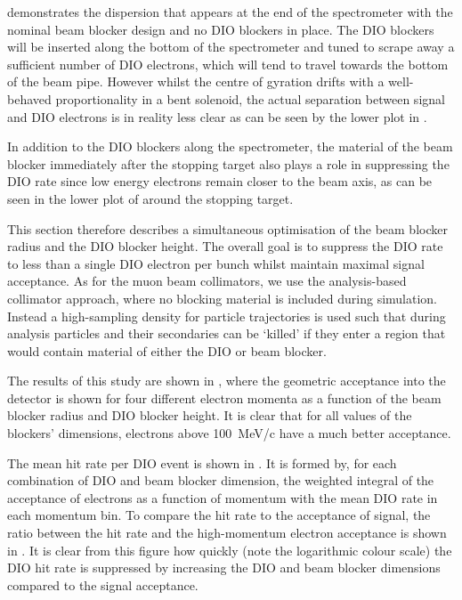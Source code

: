  demonstrates the dispersion that appears at the end of the spectrometer with the nominal beam blocker design and no DIO blockers in place.
The DIO blockers will be inserted along the bottom of the spectrometer and tuned to scrape away a sufficient number of DIO electrons, which will tend to travel towards the bottom of the beam pipe.
However whilst the centre of gyration drifts with a well-behaved proportionality in a bent solenoid, the actual separation between signal and \ac{DIO} electrons is in reality less clear as can be seen by the lower plot in .

In addition to the DIO blockers along the spectrometer, the material of the beam blocker immediately after the stopping target also plays a role in suppressing the \ac{DIO} rate since low energy electrons remain closer to the beam axis, as can be seen in the lower plot of  around the stopping target.

This section therefore describes a simultaneous optimisation of the beam blocker radius and the DIO blocker height.
The overall goal is to suppress the DIO rate to less than a single DIO electron per bunch whilst maintain maximal signal acceptance.
As for the muon beam collimators, we use the analysis-based collimator approach, where no blocking material is included during simulation.
Instead a high-sampling density for particle trajectories is used such that during analysis particles and their secondaries can be `killed' if they enter a region that would contain material of either the DIO or beam blocker.

\FigOptimDIOBeamBlockAcceptances
\FigOptimDIOBeamBlockHitRate
The results of this study are shown in , where the geometric acceptance into the detector is shown for four different electron momenta as a function of the beam blocker radius and DIO blocker height.
It is clear that for all values of the blockers' dimensions, electrons above 100~MeV/c have a much better acceptance.

The mean hit rate per DIO event is shown in .  
It is formed by, for each combination of DIO and beam blocker dimension, the weighted integral of the acceptance of electrons as a function of momentum with the mean DIO rate in each momentum bin.
To compare the hit rate to the acceptance of signal, the ratio between the hit rate and the high-momentum electron acceptance is shown in .
It is clear from this figure how quickly (note the logarithmic colour scale) the DIO hit rate is suppressed by increasing the DIO and beam blocker dimensions compared to the signal acceptance.

